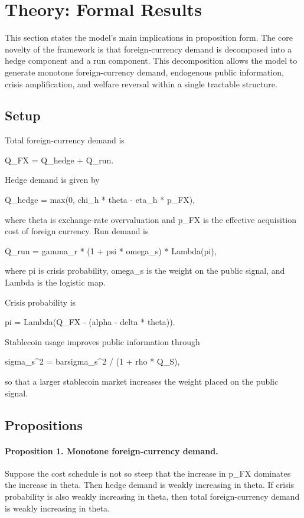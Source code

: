 \section{Theory: Formal Results}\label{sec:theory_formal}

This section states the model's main implications in proposition form. The core novelty of the framework is that foreign-currency demand is decomposed into a hedge component and a run component. This decomposition allows the model to generate monotone foreign-currency demand, endogenous public information, crisis amplification, and welfare reversal within a single tractable structure.

\subsection{Setup}

Total foreign-currency demand is

Q_FX = Q_hedge + Q_run.

Hedge demand is given by

Q_hedge = max(0, chi_h * theta - eta_h * p_FX),

where theta is exchange-rate overvaluation and p_FX is the effective acquisition cost of foreign currency. Run demand is

Q_run = gamma_r * (1 + psi * omega_s) * Lambda(pi),

where pi is crisis probability, omega_s is the weight on the public signal, and Lambda is the logistic map.

Crisis probability is

pi = Lambda(Q_FX - (alpha - delta * theta)).

Stablecoin usage improves public information through

sigma_s^2 = barsigma_s^2 / (1 + rho * Q_S),

so that a larger stablecoin market increases the weight placed on the public signal.

\subsection{Propositions}

\paragraph{Proposition 1. Monotone foreign-currency demand.}
Suppose the cost schedule is not so steep that the increase in p_FX dominates the increase in theta. Then hedge demand is weakly increasing in theta. If crisis probability is also weakly increasing in theta, then total foreign-currency demand is weakly increasing in theta.

